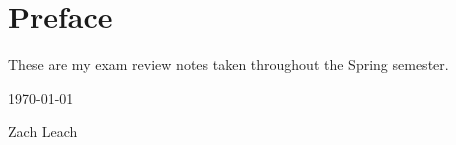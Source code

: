 \chapter*{Preface}

These are my exam review notes taken throughout the Spring semester.

\vspace{12pt}
\hfill \today 

\hfill Zach Leach


